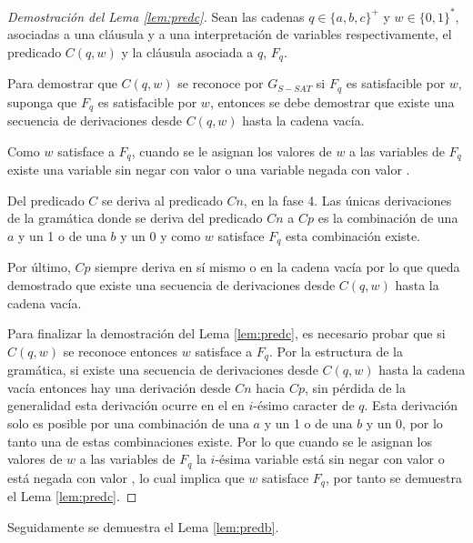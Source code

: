 \begin{proof}[Demostración del Lema \ref{lem:predc}]
    Sean las cadenas $q\in \{a,b,c\}^+$ y $w\in \{0,1\}^*$, asociadas a una cláusula y a una interpretación de 
    variables respectivamente, el predicado $C(q,w)$ y la cláusula asociada a $q$, $F_q$. 
    
    Para demostrar que $C(q,w)$ se reconoce por $G_{S-SAT}$ si $F_q$ es satisfacible por $w$, suponga que $F_q$ es satisfacible por $w$, entonces se debe demostrar que existe una secuencia de derivaciones desde $C(q,w)$ hasta la cadena vacía.
    
    Como $w$ satisface a $F_q$, cuando se le asignan los valores de $w$ a las variables de $F_q$ existe una variable sin negar con valor \true{} o una variable negada con valor \false{}.
    
    Del predicado $C$ se deriva al predicado $Cn$, en la fase 4. Las únicas derivaciones de la gramática donde se deriva del predicado $Cn$ a $Cp$ es la combinación de una $a$ y un 1 o de una $b$ y un 0 y como $w$ satisface $F_q$ esta combinación existe. 
    
    Por último, $Cp$ siempre deriva en sí mismo o en la cadena vacía por lo que queda demostrado que existe una secuencia de derivaciones desde $C(q,w)$ hasta la cadena vacía.
    
    Para finalizar la demostración del Lema \ref{lem:predc}, es necesario probar que si $C(q,w)$ se reconoce entonces $w$ satisface a $F_q$. Por la estructura de la gramática, si existe una secuencia de derivaciones desde $C(q,w)$ hasta la cadena vacía entonces hay una derivación desde $Cn$ hacia $Cp$, sin pérdida de la generalidad esta derivación ocurre en el en $i$-ésimo caracter de $q$. Esta derivación solo es posible por una combinación de una $a$ y un 1 o de una $b$ y un 0, por lo tanto una de estas combinaciones existe. Por lo que cuando se le asignan los valores de $w$ a las variables de $F_q$ la $i$-ésima variable está
    sin negar con valor \true{} o está negada con valor \false{}, lo cual implica que $w$ satisface $F_q$, por tanto se demuestra el Lema \ref{lem:predc}.
\end{proof}


Seguidamente se demuestra el Lema \ref{lem:predb}.

